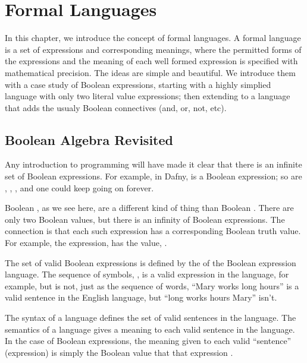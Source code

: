 \documentclass[letterpaper,10pt,english]{sphinxmanual}
\begin{document}
\chapter{Formal Languages}
\label{\detokenize{10-formal-languages:formal-languages}}\label{\detokenize{10-formal-languages::doc}}
In this chapter, we introduce the concept of formal languages. A
formal language is a set of expressions and corresponding meanings,
where the permitted forms of the expressions and the meaning of each
well formed expression is specified with mathematical precision.  The
ideas are simple and beautiful. We introduce them with a case study of
Boolean expressions, starting with a highly simplied language with
only two literal value expressions; then extending to a language that
adds the usualy Boolean connectives (and, or, not, etc).


\section{Boolean Algebra Revisited}
\label{\detokenize{10-formal-languages:boolean-algebra-revisited}}
Any introduction to programming will have made it clear that there is
an infinite set of Boolean expressions. For example, in Dafny, 
is a Boolean expression; so are , , , and one could keep going on forever.

Boolean , as we see here, are a different kind of thing
than Boolean . There are only two Boolean values, but there is
an infinity of Boolean expressions. The connection is that each such
expression has a corresponding Boolean truth value. For example, the
expression,  has the value, .

The set of valid Boolean expressions is defined by the  of the
Boolean expression language. The sequence of symbols, , is a valid expression in the language, for example, but
 is not, just as the sequence of words,
“Mary works long hours” is a valid sentence in the English language,
but “long works hours Mary” isn’t.

The syntax of a language defines the set of valid sentences in the
language. The semantics of a language gives a meaning to each valid
sentence in the language. In the case of Boolean expressions, the
meaning given to each valid “sentence” (expression) is simply the
Boolean value that that expression .
\end{document}
